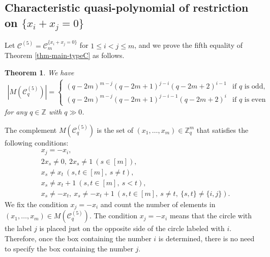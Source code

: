 \documentclass{article}
\theoremstyle{plain}
\newtheorem{Them}{Theorem}[section]
\theoremstyle{definition}
\theoremstyle{remark}
\numberwithin{equation}{section}
\newcommand{\Cc}{\mathcal{C}}
\begin{document}
\subsection{Characteristic quasi-polynomial of restriction on $\{x_i+x_j=0\}$}\label{sec-TypeC-rest-xi=-xj}
Let $\Cc^{(5)}=\mathcal{C}_m^{\{x_i+x_j=0\}}$ for $1\leq i<j \leq m$, and we prove the fifth equality of Theorem \ref{thm-main-typeC} as follows.
\begin{Them}\label{thm-char-quasi-TypeC-xi=-xj}
We have
\begin{align*}
\left|M(\Cc_q^{(5)})\right|=
\begin{cases}
(q-2m)^{m-j}(q-2m+1)^{j-i}(q-2m+2)^{i-1}&\text{if $q$ is odd},\\
(q-2m)^{m-j}(q-2m+1)^{j-i-1}(q-2m+2)^{i}&\text{if $q$ is even}
\end{cases}
\end{align*}
for any $q\in\mathbb{Z}$ with $q\gg 0$.
\end{Them}
The complement $M(\Cc^{(5)}_q)$ is the set of $(x_1,\dots,x_m)\in\mathbb{Z}_q^m$ that satisfies the following conditions:
\begin{align*}
&x_j=-x_i,\\
&2x_s\neq 0,\ 2x_s\neq 1\ (s\in [m]),\\
&x_s\neq x_t\ (s,t\in [m],\ s\neq t),\\
&x_s\neq x_t+1\ (s,t\in [m],\ s<t),\\
&x_s\neq -x_t,\ x_s\neq -x_t+1\ (s,t\in [m],\ s\neq t,\ \{s,t\}\neq \{i,j\}).
\end{align*}
We fix the condition $x_j=-x_i$ and count the number of elements in $(x_1,\dots,x_m)\in M(\Cc^{(5)}_q)$. %
The condition $x_j=-x_i$ means that the circle with the label $j$ is placed just on the opposite side of the circle labeled with $i$. 
Therefore, once the box containing the number $i$ is determined, there is no need to specify the box containing the number $j$.
\end{document}
